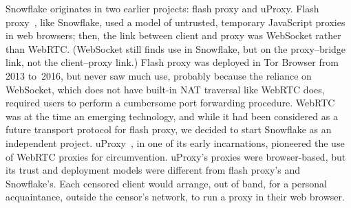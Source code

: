 \documentclass[letterpaper,twocolumn]{article}
\begin{document}
Snowflake originates in two earlier projects:
flash proxy and uProxy.
Flash proxy~\cite{Fifield2012a}, like Snowflake, used a model
of untrusted, temporary JavaScript proxies in web browsers;
then, the link between client and proxy was WebSocket
rather than WebRTC.
(WebSocket still finds use in Snowflake,
but on the proxy--bridge link,
not the client--proxy link.)
Flash proxy was deployed in Tor Browser
from 2013 to~2016,
but never saw much use,
probably because the reliance on WebSocket,
which does not have built-in NAT traversal like WebRTC does,
required users to perform a
cumbersome port forwarding procedure.
WebRTC was at the time an emerging technology, and while
it had been considered as a future transport protocol for flash proxy,
we decided to start Snowflake as an independent project.
uProxy~\cite{uproxy}, in one of its early incarnations,
pioneered the use of WebRTC proxies for circumvention.
uProxy's proxies were browser-based,
but its trust and deployment models were different
from flash proxy's and Snowflake's.
Each censored client would arrange, out of band,
for a personal acquaintance, outside the censor's network,
to run a proxy in their web browser.
\end{document}
